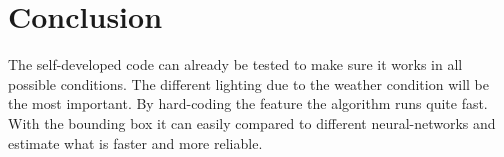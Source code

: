\documentclass[10pt,a4paper]{article}
\begin{document}
	\section{Conclusion}
	The self-developed code can already be tested to make sure it works in all possible conditions. The different lighting due to the weather condition will be the most important.
	By hard-coding the feature the algorithm runs quite fast. With the bounding box it can easily compared to different neural-networks and estimate what is faster and more reliable. 

	
\end{document}
